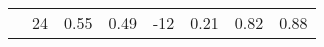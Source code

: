 \begin{table}
\begin{center}
\begin{tabular}{l|ccccccc}
   & 24  &   0.55  &   0.49  &  -12 & 0.21 & 0.82 & 0.88\\%

\end{tabular}
\end{center}
\end{table}
